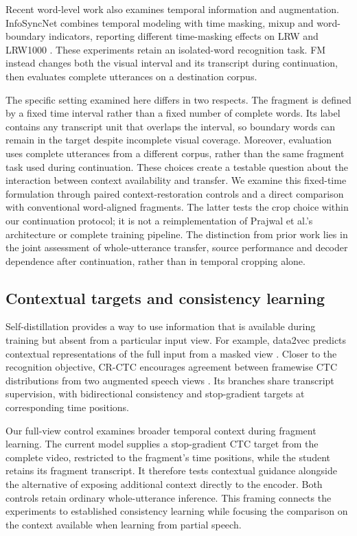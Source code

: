 Recent word-level work also examines temporal information and augmentation.
InfoSyncNet combines temporal modeling with time masking, mixup and word-boundary
indicators, reporting different time-masking effects on LRW and LRW1000
\cite{xue2025infosyncnet}. These experiments retain an isolated-word recognition
task. FM instead changes both the visual interval and its transcript during
continuation, then evaluates complete utterances on a destination corpus.

The specific setting examined here differs in two respects. The fragment is defined
by a fixed time interval rather than a fixed number of complete words. Its label
contains any transcript unit that overlaps the interval, so boundary words can
remain in the target despite incomplete visual coverage. Moreover, evaluation
uses complete utterances from a different corpus, rather than the same fragment
task used during continuation. These choices create a testable question about the
interaction between context availability and transfer. We examine this fixed-time
formulation through paired context-restoration controls and a direct comparison
with conventional word-aligned fragments. The latter tests the crop choice within
our continuation protocol; it is not a reimplementation of Prajwal et al.'s
architecture or complete training pipeline. The distinction from prior work lies
in the joint assessment of whole-utterance transfer, source performance and
decoder dependence after continuation, rather than in temporal cropping alone.

\subsection{Contextual targets and consistency learning}
Self-distillation provides a way to use information that is available during
training but absent from a particular input view. For example, data2vec predicts
contextual representations of the full input from a masked view
\cite{baevski2022data2vec}. Closer to the recognition objective, CR-CTC encourages
agreement between framewise CTC distributions from two augmented speech views
\cite{yao2025crctc}. Its branches share transcript supervision, with bidirectional
consistency and stop-gradient targets at corresponding time positions.

Our full-view control examines broader temporal context during fragment learning.
The current model supplies a stop-gradient CTC target from the complete video,
restricted to the fragment's time positions, while the student retains its
fragment transcript. It therefore tests contextual guidance alongside the
alternative of exposing additional context directly to the encoder. Both controls
retain ordinary whole-utterance inference. This framing connects the experiments
to established consistency learning while focusing the comparison on the context
available when learning from partial speech.

